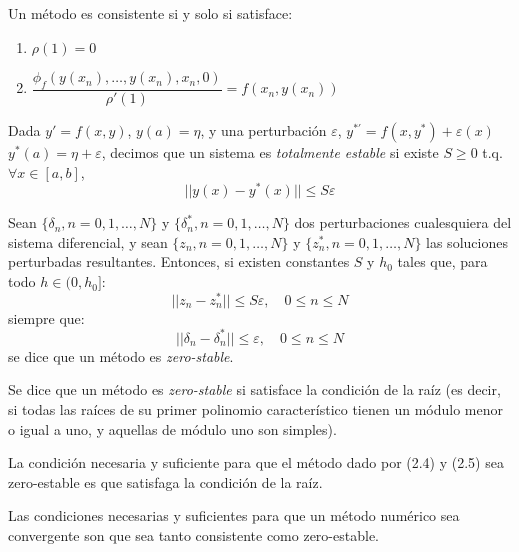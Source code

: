 \begin{prop} Un método es consistente si y solo si satisface:
\begin{enumerate}[itemsep=1em]
    \item $\rho(1) = 0$
    \item $\dfrac{\phi_f(y(x_n), \dots, y(x_n), x_n, 0)}{\rho'(1)} = f(x_n, y(x_n))$
\end{enumerate}
\end{prop}

\begin{defi}
    Dada $y'=f(x,y)$, $y(a)=\eta$, y una perturbación $\varepsilon$, $y^{*\prime}=f(x,y^*)+\varepsilon(x)$ $y^*(a)=\eta+\varepsilon$, decimos que un sistema es \textit{totalmente estable} si existe $S \ge 0$ t.q. $\forall x \in [a,b]$,
$$ ||y(x) - y^*(x)|| \le S \varepsilon$$
\end{defi} 
   
 \begin{defi}  
Sean $\{\delta_n, n=0, 1, \dots, N\}$ y $\{\delta_n^*, n=0, 1, \dots, N\}$ dos perturbaciones cualesquiera del sistema diferencial, y sean $\{z_n, n=0, 1, \dots, N\}$ y $\{z_n^*, n=0, 1, \dots, N\}$ las soluciones perturbadas resultantes. Entonces, si existen constantes $S$ y $h_0$ tales que, para todo $h \in (0, h_0]$:
   $$\vert{}\vert{}z_n - z_n^*\vert{}\vert{} \le S\varepsilon, \quad 0 \le n \le N$$siempre que:$$\vert{}\vert{}\delta_n - \delta_n^*\vert{}\vert{} \le \varepsilon, \quad 0 \le n \le N$$
se dice que un método es \textit{zero-stable}. 
\end{defi}

\begin{defi}[alternativa] Se dice que un método es \textit{zero-stable} si satisface la condición de la raíz (es decir, si todas las raíces de su primer polinomio característico tienen un módulo menor o igual a uno, y aquellas de módulo uno son simples).
\end{defi}

\begin{teo}
    [2.1] La condición necesaria y suficiente para que el método dado por (2.4) y (2.5) sea zero-estable es que satisfaga la condición de la raíz.
\end{teo}
\begin{teo}
    [2.2] Las condiciones necesarias y suficientes para que un método num\'erico sea convergente son que sea tanto consistente como zero-estable.
\end{teo} 

